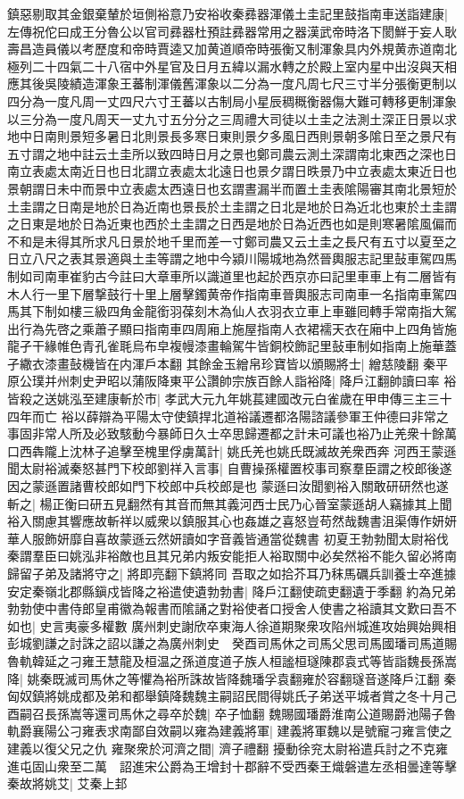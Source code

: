 鎮惡剔取其金銀棄輦於垣側裕意乃安裕收秦彞器渾儀土圭記里鼓指南車送詣建康|{
	左傳祝佗曰成王分魯公以官司彞器杜預註彞器常用之器漢武帝時洛下閡鮮于妄人耿壽昌造員儀以考歷度和帝時賈逵又加黄道順帝時張衡又制渾象具内外規黄赤道南北極列二十四氣二十八宿中外星官及日月五緯以漏水轉之於殿上室内星中出沒與天相應其後吳陵績造渾象王蕃制渾儀舊渾象以二分為一度凡周七尺三寸半分張衡更制以四分為一度凡周一丈四尺六寸王蕃以古制局小星辰稠穊衡器傷大難可轉移更制渾象以三分為一度凡周天一丈九寸五分分之三周禮大司徒以土圭之法測土深正日景以求地中日南則景短多暑日北則景長多寒日東則景夕多風日西則景朝多隂日至之景尺有五寸謂之地中註云土圭所以致四時日月之景也鄭司農云測土深謂南北東西之深也日南立表處太南近日也日北謂立表處太北遠日也景夕謂日昳景乃中立表處太東近日也景朝謂日未中而景中立表處太西遠日也玄謂晝漏半而置土圭表隂陽審其南北景短於土圭謂之日南是地於日為近南也景長於土圭謂之日北是地於日為近北也東於土圭謂之日東是地於日為近東也西於土圭謂之日西是地於日為近西也如是則寒暑隂風偏而不和是未得其所求凡日景於地千里而差一寸鄭司農又云土圭之長尺有五寸以夏至之日立八尺之表其景適與土圭等謂之地中今潁川陽城地為然晉輿服志記里鼔車駕四馬制如司南車崔豹古今註曰大章車所以識道里也起於西京亦曰記里車車上有二層皆有木人行一里下層撃鼓行十里上層擊鐲黄帝作指南車晉輿服志司南車一名指南車駕四馬其下制如樓三級四角金龍銜羽葆刻木為仙人衣羽衣立車上車雖囘轉手常南指大駕出行為先啓之乘蕭子顯曰指南車四周廂上施屋指南人衣裙襦天衣在廂中上四角皆施龍孑干緣帷色青孔雀毦烏布皁複幔漆畫輪駕牛皆銅校飾記里鼔車制如指南上施華蓋孑繖衣漆畫鼔機皆在内渾戶本翻}
其餘金玉繒帛珍寶皆以頒賜將士|{
	繒慈陵翻}
秦平原公璞并州刺史尹昭以蒲阪降東平公讚帥宗族百餘人詣裕降|{
	降戶江翻帥讀曰率}
裕皆殺之送姚泓至建康斬於市|{
	孝武大元九年姚萇建國改元白雀歲在甲申傳三主三十四年而亡}
裕以薛辯為平陽太守使鎮捍北道裕議遷都洛陽諮議參軍王仲德曰非常之事固非常人所及必致駭動今暴師日久士卒思歸遷都之計未可議也裕乃止羌衆十餘萬口西犇隴上沈林子追擊至槐里俘虜萬計|{
	姚氏羌也姚氏既滅故羌衆西奔}
河西王蒙遜聞太尉裕滅秦怒甚門下校郎劉祥入言事|{
	自曹操孫權置校事司察羣臣謂之校郎後遂因之蒙遜置諸曹校郎如門下校郎中兵校郎是也}
蒙遜曰汝聞劉裕入關敢研研然也遂斬之|{
	楊正衡曰研五見翻然有其音而無其義河西士民乃心晉室蒙遜胡人竊據其上聞裕入關慮其響應故斬祥以威衆以鎮服其心也姦雄之喜怒豈苟然哉魏書沮渠傳作妍妍華人服飾妍靡自喜故蒙遜云然妍讀如字音義皆通當從魏書}
初夏王勃勃聞太尉裕伐秦謂羣臣曰姚泓非裕敵也且其兄弟内叛安能拒人裕取關中必矣然裕不能久留必將南歸留子弟及諸將守之|{
	將即亮翻下鎮將同}
吾取之如拾芥耳乃秣馬礪兵訓養士卒進據安定秦嶺北郡縣鎭戍皆降之裕遣使遺勃勃書|{
	降戶江翻使疏吏翻遺于季翻}
約為兄弟勃勃使中書侍郎皇甫徽為報書而隂誦之對裕使者口授舍人使書之裕讀其文歎曰吾不如也|{
	史言夷豪多權數}
廣州刺史謝欣卒東海人徐道期聚衆攻陷州城進攻始興始興相彭城劉謙之討誅之詔以謙之為廣州刺史　癸酉司馬休之司馬父思司馬國璠司馬道賜魯軌韓延之刁雍王慧龍及桓温之孫道度道子族人桓謐桓璲陳郡袁式等皆詣魏長孫嵩降|{
	姚秦既滅司馬休之等懼為裕所誅故皆降魏璠孚袁翻雍於容翻璲音遂降戶江翻}
秦匈奴鎮將姚成都及弟和都舉鎮降魏魏主嗣詔民間得姚氏子弟送平城者賞之冬十月己酉嗣召長孫嵩等還司馬休之尋卒於魏|{
	卒子恤翻}
魏賜國璠爵淮南公道賜爵池陽子魯軌爵襄陽公刁雍表求南鄙自效嗣以雍為建義將軍|{
	建義將軍魏以是號寵刁雍言使之建義以復父兄之仇}
雍聚衆於河濟之間|{
	濟子禮翻}
擾動徐兖太尉裕遣兵討之不克雍進屯固山衆至二萬　詔進宋公爵為王增封十郡辭不受西秦王熾磐遣左丞相曇達等擊秦故將姚艾|{
	艾秦上邽}


